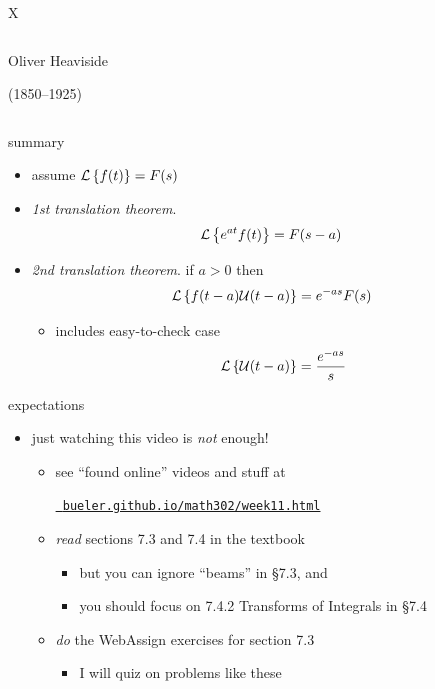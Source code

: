 \documentclass[urlcolor=blue,dvipsnames]{beamer}
\begin{document}
\begin{frame}{X}
\begin{columns}
\begin{column}{0.23\textwidth}
\tiny
Oliver Heaviside

(1850--1925)
\end{column}
\end{columns}
\end{frame}


\begin{frame}{summary}

\begin{itemize}
\item assume $\mathcal{L}\left\{f(t)\right\}=F(s)$
\item \emph{1st translation theorem}.
    $$\mathcal{L}\left\{e^{at} f(t)\right\} = F(s-a)$$
\item \emph{2nd translation theorem}.  if $a>0$ then
    $$\mathcal{L}\left\{f(t-a) \mathcal{U}(t-a)\right\} = e^{-as} F(s)$$

\vspace{-2mm}
    \begin{itemize}
    \item includes easy-to-check case
    $$\mathcal{L}\left\{\mathcal{U}(t-a)\right\} = \frac{e^{-as}}{s}$$
    \end{itemize}
\end{itemize}
\end{frame}


\begin{frame}{expectations}

\begin{itemize}
\item just watching this video is \emph{not} enough!
     \begin{itemize}
     \item see ``found online'' videos and stuff at

     \centerline{\href{https://bueler.github.io/math302/week11.html}{\tt \color{cyan} bueler.github.io/math302/week11.html}}
     \item \emph{read} sections 7.3 and 7.4 in the textbook
         \begin{itemize}
         \item but you can ignore ``beams'' in \S7.3, and
         \item you should focus on 7.4.2 Transforms of Integrals in \S7.4
         \end{itemize}
     \item \emph{do} the WebAssign exercises for section 7.3
         \begin{itemize}
         \item I will quiz on problems like these
         \end{itemize}
     \end{itemize}
\end{itemize}
\end{frame}
\end{document}
